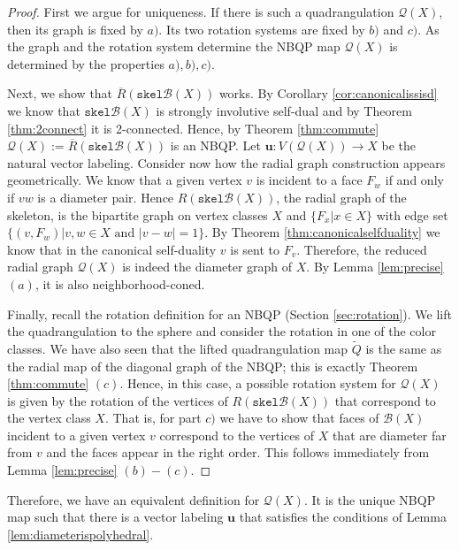 \documentclass[10pt,a4paper]{article}
\newcommand{\vu}[0]{\mathbf{u}}
\newcommand{\Bc}[0]{\mathcal{B}}
\newcommand{\skel}[0]{\mathtt{skel}}
\newcommand{\qt}{\mathcal{Q}}
\begin{document}
\begin{proof}
    First we argue for uniqueness. If there is such a quadrangulation $\qt(X)$, then its graph is fixed by $a)$. Its two rotation systems are fixed by $b)$ and $c)$. As the graph and the rotation system determine the NBQP map $\qt(X)$ is determined by the properties $a),b),c)$.
    
    Next, we show that $\overline{R}(\skel\Bc(X))$ works. By Corollary  \ref{cor:canonicalissisd} we know that $\skel\Bc(X)$ is strongly involutive self-dual and by Theorem \ref{thm:2connect} it is 2-connected. Hence, by Theorem \ref{thm:commute} $\qt(X):=\overline R(\skel\Bc(X))$ is an NBQP. Let $\vu:V(\qt(X))\rightarrow X$ be the natural vector labeling. Consider now how the radial graph construction appears geometrically. We know that a given vertex $v$ is incident to a face $F_w$ if and only if $vw$ is a diameter pair. Hence $R(\skel\Bc(X))$, the radial graph of the skeleton, is the bipartite graph on vertex classes $X$ and $\{F_x|x\in X\}$ with edge set $\{(v,F_w) | v,w\in X \text{ and }|v-w|=1 \}$. By Theorem \ref{thm:canonicalselfduality} we know that in the canonical self-duality $v$ is sent to $F_v$. Therefore, the reduced radial graph $\qt(X)$ is indeed the diameter graph of $X$. By Lemma \ref{lem:precise} $(a)$, it is also neighborhood-coned.

    Finally, recall the rotation definition for an NBQP (Section \ref{sec:rotation}). We lift the quadrangulation to the sphere and consider the rotation in one of the color classes. We have also seen that the lifted quadrangulation map $\widetilde Q$ is the same as the radial map of the diagonal graph of the NBQP; this is exactly Theorem \ref{thm:commute} $(c)$.  Hence, in this case, a possible rotation system for $\qt(X)$ is given by the rotation of the vertices of $R(\skel\Bc(X))$ that correspond to the vertex class $X$. That is, for part $c)$ we have to show that faces of $\Bc(X)$ incident to a given vertex $v$ correspond to the vertices of $X$ that are diameter far from $v$ and the faces appear in the right order. This follows immediately from Lemma \ref{lem:precise} $(b)-(c)$.
    
\end{proof}

Therefore, we have an equivalent definition for $\qt(X)$. It is the unique NBQP map such that there is a vector labeling $\vu$ that satisfies the conditions of Lemma \ref{lem:diameterispolyhedral}. 
\end{document}
